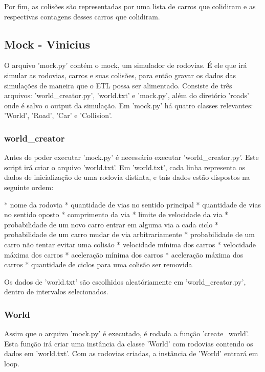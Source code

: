 \documentclass{article}
\begin{document}
    Por fim, as colisões são representadas por uma lista de carros que colidiram e as respectivas
    contagens desses carros que colidiram.

    \subsection*{Mock - Vinicius}
    O arquivo 'mock.py' contém o mock, um simulador de rodovias. É ele que irá simular as rodovias,
    carros e suas colisões, para então gravar os dados das simulações de maneira que o ETL possa ser alimentado.
    Consiste de três arquivos: 'world_creator.py', 'world.txt' e 'mock.py', além do diretório 'roads' onde é salvo
    o output da simulação. Em 'mock.py' há quatro classes relevantes: 'World', 'Road', 'Car' e 'Collision'.

    \subsubsection*{world_creator}
    Antes de poder executar 'mock.py' é necessário executar 'world_creator.py'. Este script irá criar o arquivo
    'world.txt'. Em 'world.txt', cada linha representa os dados de inicialização de uma rodovia distinta, e tais
    dados estão dispostos na seguinte ordem:

    * nome da rodovia
    * quantidade de vias no sentido principal
    * quantidade de vias no sentido oposto
    * comprimento da via
    * limite de velocidade da via
    * probabilidade de um novo carro entrar em alguma via a cada ciclo
    * probabilidade de um carro mudar de via arbitrariamente
    * probabilidade de um carro não tentar evitar uma colisão
    * velocidade mínima dos carros
    * velocidade máxima dos carros
    * aceleração mínima dos carros
    * aceleração máxima dos carros
    * quantidade de ciclos para uma colisão ser removida

    Os dados de 'world.txt' são escolhidos aleatóriamente em 'world_creator.py', dentro de intervalos selecionados.

    \subsubsection{World}
    Assim que o arquivo 'mock.py' é executado, é rodada a função 'create_world'. Esta função irá criar uma instância
    da classe 'World' com rodovias contendo os dados em 'world.txt'. Com as rodovias criadas, a instância de 'World'
    entrará em loop.
\end{document}
